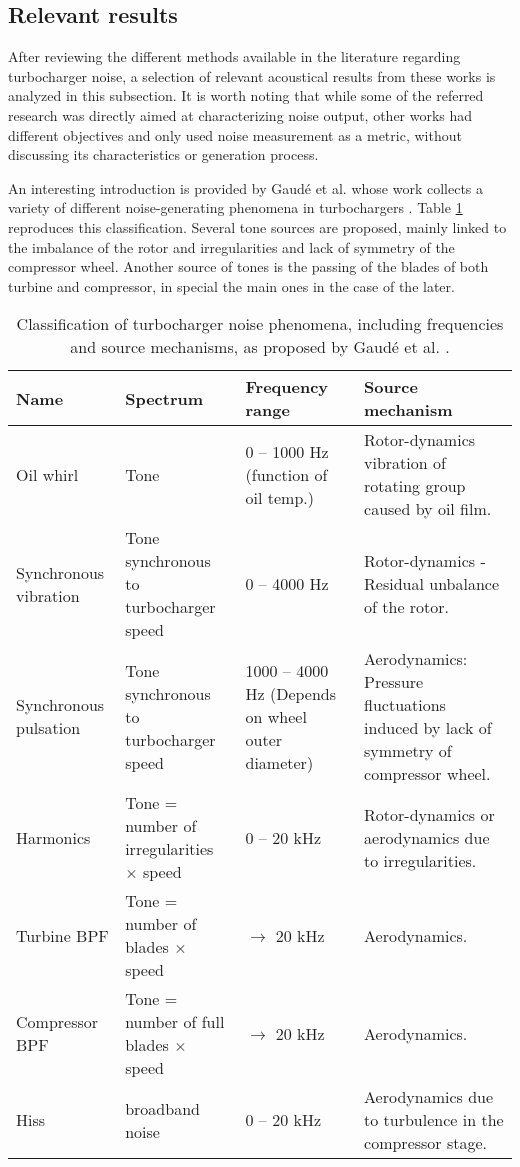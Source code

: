 \subsection{Relevant results}

After reviewing the different methods available in the literature regarding turbocharger noise, a selection of relevant acoustical results from these works is analyzed in this subsection. It is worth noting that while some of the referred research was directly aimed at characterizing noise output, other works had different objectives and only used noise measurement as a metric, without discussing its characteristics or generation process.

An interesting introduction is provided by Gaudé et al.  whose work collects a variety of different noise-generating phenomena in turbochargers \cite{gaude2008experimental}. Table \ref{tab:lit_gaude_sources} reproduces this classification. Several tone sources are proposed, mainly linked to the imbalance of the rotor and irregularities and lack of symmetry of the compressor wheel. Another source of tones is the passing of the blades of both turbine and compressor, in special the main ones in the case of the later.

\begin{table}[b!]
  \centering
  \caption{Classification of turbocharger noise phenomena, including frequencies and source mechanisms, as proposed by Gaudé et al. \cite{gaude2008experimental}.}
  \footnotesize
  \begin{adjustwidth}{-0.6cm}{}
    \begin{tabular}{p{2cm}p{3cm}p{2.5cm}p{4cm}}
    \toprule
    \textbf{Name} & \textbf{Spectrum} & \textbf{Frequency range} & \textbf{Source mechanism} \\
    \midrule
    Oil whirl & Tone  & 0 -- 1000 Hz
(function of oil temp.) & Rotor-dynamics vibration of rotating group caused by oil film. \\
    Synchronous vibration & Tone synchronous to turbocharger speed & 0 -- 4000 Hz & Rotor-dynamics
- Residual unbalance of  the rotor. \\
    Synchronous pulsation & Tone synchronous to turbocharger speed & 1000 -- 4000 Hz
(Depends on wheel outer diameter) & Aerodynamics: Pressure fluctuations induced by lack of symmetry of compressor wheel. \\
    Harmonics & Tone = number of irregularities $\times$ speed & 0 -- 20 kHz & Rotor-dynamics or aerodynamics due to irregularities. \\
    Turbine BPF & Tone = number of blades $\times$ speed & $\rightarrow$ 20 kHz & Aerodynamics. \\
    Compressor BPF & Tone = number of full blades $\times$ speed & $\rightarrow$ 20 kHz & Aerodynamics. \\
    Hiss  & broadband noise & 0 -- 20 kHz & Aerodynamics due to turbulence in the compressor stage. \\
    \bottomrule
    \end{tabular}
    \end{adjustwidth}
  \label{tab:lit_gaude_sources}
\end{table}

